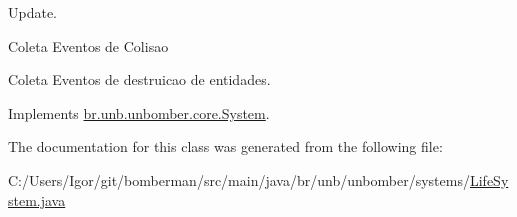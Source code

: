 Update. 

Coleta Eventos de Colisao

Coleta Eventos de destruicao de entidades.

Implements \hyperlink{interfacebr_1_1unb_1_1unbomber_1_1core_1_1_system_a6b1268f3fef77e2ce797eedc1b34eb44}{br.\+unb.\+unbomber.\+core.\+System}.



The documentation for this class was generated from the following file\+:\begin{DoxyCompactItemize}
\item 
C\+:/\+Users/\+Igor/git/bomberman/src/main/java/br/unb/unbomber/systems/\hyperlink{_life_system_8java}{Life\+System.\+java}\end{DoxyCompactItemize}
